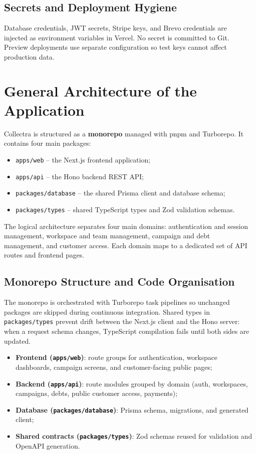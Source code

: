 \documentclass[12pt,a4paper]{report}
\begin{document}
\subsection{Secrets and Deployment Hygiene}

Database credentials, JWT secrets, Stripe keys, and Brevo credentials are injected as
environment variables in Vercel.
No secret is committed to Git.
Preview deployments use separate configuration so test keys cannot affect production
data.

\section{General Architecture of the Application}

Collectra is structured as a \textbf{monorepo} managed with pnpm and Turborepo.
It contains four main packages:
\begin{itemize}
  \item \texttt{apps/web} -- the Next.js frontend application;
  \item \texttt{apps/api} -- the Hono backend REST API;
  \item \texttt{packages/database} -- the shared Prisma client and database schema;
  \item \texttt{packages/types} -- shared TypeScript types and Zod validation schemas.
\end{itemize}

The logical architecture separates four main domains: authentication and session
management, workspace and team management, campaign and debt management, and customer
access.
Each domain maps to a dedicated set of API routes and frontend pages.

\subsection{Monorepo Structure and Code Organisation}

The monorepo is orchestrated with Turborepo task pipelines so unchanged packages are
skipped during continuous integration.
Shared types in \texttt{packages/types} prevent drift between the Next.js client and
the Hono server: when a request schema changes, TypeScript compilation fails until
both sides are updated.

\begin{itemize}
  \item \textbf{Frontend (\texttt{apps/web})}: route groups for authentication,
        workspace dashboards, campaign screens, and customer-facing public pages;
  \item \textbf{Backend (\texttt{apps/api})}: route modules grouped by domain (auth,
        workspaces, campaigns, debts, public customer access, payments);
  \item \textbf{Database (\texttt{packages/database})}: Prisma schema, migrations,
        and generated client;
  \item \textbf{Shared contracts (\texttt{packages/types})}: Zod schemas reused for
        validation and OpenAPI generation.
\end{itemize}
\end{document}
